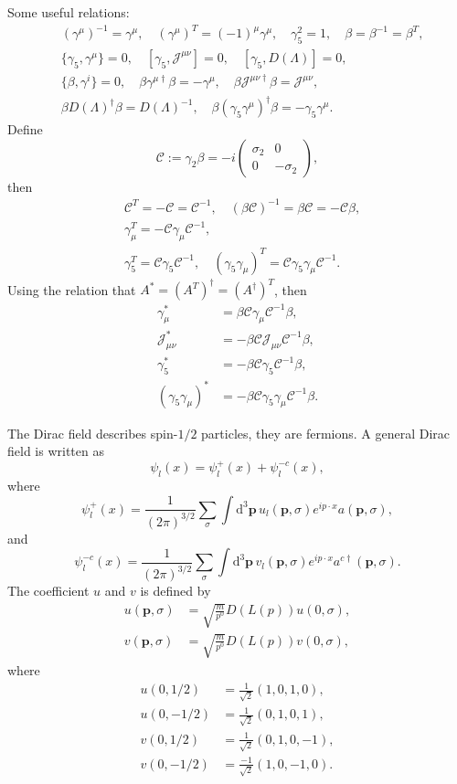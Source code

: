 \documentclass[9pt]{extbook}
\begin{document}
Some useful relations:
\[
\begin{split}
	&(\gamma^{\mu})^{-1}=\gamma^{\mu},\quad (\gamma^\mu)^T=(-1)^\mu \gamma^\mu, \quad \gamma_5^2=1,\quad \beta=\beta^{-1}=\beta^T,\\
	&\{\gamma_5,\gamma^\mu\}=0,\quad [\gamma_5,\mathscr{J}^{\mu\nu}]=0,\quad [\gamma_5,D(\Lambda)]=0,\\
	&\{\beta,\gamma^i\}=0,\quad\beta \gamma^{\mu\dag}\beta=-\gamma^{\mu},\quad \beta \mathscr{J}^{\mu\nu\dag}\beta=\mathscr{J}^{\mu\nu},\\
	&\beta D(\Lambda)^\dag \beta=D(\Lambda)^{-1}, \quad \beta (\gamma_5\gamma^{\mu})^\dag\beta=-\gamma_5\gamma^{\mu}.
\end{split}
\]
Define 
\[
	\mathscr{C}:=\gamma_2\beta=-i \begin{pmatrix}
		\sigma_2&0\\
		0&-\sigma_2
	\end{pmatrix},
\]
then 
\[
\begin{split}
	&\mathscr{C}^T=-\mathscr{C}=\mathscr{C}^{-1},\quad (\beta\mathscr{C})^{-1}=\beta\mathscr{C}=-\mathscr{C}\beta,\\
	&\gamma_\mu^T=-\mathscr{C}\gamma_\mu \mathscr{C}^{-1},\\
	&\gamma_5^T=\mathscr{C}\gamma_5 \mathscr{C}^{-1},\quad (\gamma_5\gamma_\mu)^T=\mathscr{C}\gamma_5\gamma_\mu \mathscr{C}^{-1}.
\end{split}
\]
Using the relation that $A^*=(A^T)^\dag=(A^\dag)^T$, then 
\[
\begin{split}
	\gamma_\mu^*&=\beta\mathscr{C}\gamma_\mu \mathscr{C}^{-1} \beta,\\
	\mathscr{J}_{\mu\nu}^*&=-\beta\mathscr{C}\mathscr{J}_{\mu\nu} \mathscr{C}^{-1} \beta,\\
	\gamma_5^*&=-\beta\mathscr{C}\gamma_5 \mathscr{C}^{-1}\beta,\\
	(\gamma_5\gamma_\mu)^*&=-\beta\mathscr{C}\gamma_5\gamma_\mu \mathscr{C}^{-1}\beta.
\end{split}
\]

The Dirac field describes spin-$1/2$ particles, they are fermions. A general Dirac field is written as
\[
	\psi_l(x)=\psi^+_l(x)+\psi^{-c}_l(x),
\]
where
\[
	\psi^+_l(x)=\frac{1}{(2\pi)^{3/2}}\sum_\sigma\int \mathrm{d}^3\bm{p}\,u_l(\bm{p},\sigma)e^{ip\cdot x}a(\bm{p},\sigma),
\]
and
\[
	\psi^{-c}_l(x)=\frac{1}{(2\pi)^{3/2}}\sum_\sigma\int \mathrm{d}^3\bm{p}\,v_l(\bm{p},\sigma)e^{ip\cdot x}a^{c\dag}(\bm{p},\sigma).
\]
The coefficient $u$ and $v$ is defined by
\begin{align*}
	u(\bm{p},\sigma)&=\sqrt{\frac{m}{p^0}}D(L(p))u(0,\sigma),\\
	v(\bm{p},\sigma)&=\sqrt{\frac{m}{p^0}}D(L(p))v(0,\sigma),
\end{align*}
where
\begin{align*}
	u(0,1/2)&=\frac{1}{\sqrt{2}}(1,0,1,0),\\
	u(0,-1/2)&=\frac{1}{\sqrt{2}}(0,1,0,1),\\
	v(0,1/2)&=\frac{1}{\sqrt{2}}(0,1,0,-1),\\
	v(0,-1/2)&=\frac{-1}{\sqrt{2}}(1,0,-1,0).
\end{align*}
\end{document}
